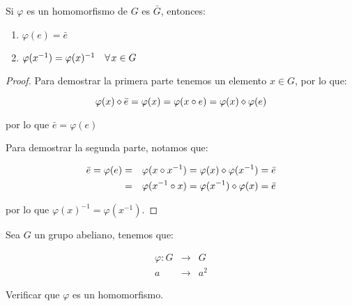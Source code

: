         \begin{lema}
            Si $\varphi$ es un homomorfismo de $G$ es $\bar{G}$, entonces:

            \begin{enumerate}
                \item $\varphi(e) = \bar{e}$
                \item $\varphi(x^{-1}) = \varphi(x)^{-1} \quad \forall \mkern2mu x \in G$
            \end{enumerate}
        \end{lema}

        \begin{proof}
            Para demostrar la primera parte tenemos un elemento $x \in G$, por lo que:

            \begin{equation*}
                \varphi(x) \diamond \bar{e} = \varphi(x) = \varphi(x \circ e) = \varphi(x) \diamond \varphi(e)
            \end{equation*}

            por lo que $\bar{e} = \varphi(e)$

            Para demostrar la segunda parte, notamos que:

            \begin{eqnarray*}
                \bar{e} = \varphi(e) & = & \varphi(x \circ x^{-1}) = \varphi(x) \diamond \varphi(x^{-1}) = \bar{e} \\
                & = & \varphi(x^{-1} \circ x) = \varphi(x^{-1}) \diamond \varphi(x) = \bar{e}
            \end{eqnarray*}

            por lo que $\varphi(x)^{-1} = \varphi(x^{-1})$.
        \end{proof}


        \begin{ejercicio}
            Sea $G$ un grupo abeliano, tenemos que:

            \begin{eqnarray*}
                \varphi \colon G & \to & G \\
                a & \to & a^2
            \end{eqnarray*}

            Verificar que $\varphi$ es un homomorfismo.
        \end{ejercicio}

